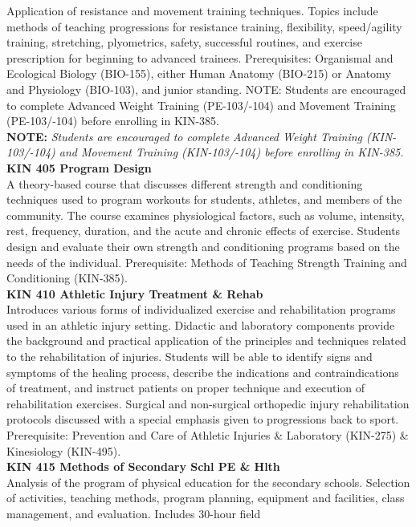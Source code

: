 \documentclass[
  letterpaper,
]{scrbook}
\begin{document}
Application of resistance and movement training techniques. Topics
include methods of teaching progressions for resistance training,
flexibility, speed/agility training, stretching, plyometrics, safety,
successful routines, and exercise prescription for beginning to advanced
trainees. Prerequisites: Organismal and Ecological Biology (BIO-155),
either Human Anatomy (BIO-215) or Anatomy and Physiology (BIO-103), and
junior standing. NOTE: Students are encouraged to complete Advanced
Weight Training (PE-103/-104) and Movement Training (PE-103/-104) before
enrolling in KIN-385.\\
\textbf{NOTE:} \emph{Students are encouraged to complete Advanced Weight
Training (KIN-103/-104) and Movement Training (KIN-103/-104) before
enrolling in KIN-385.}\\
\textbf{KIN 405 Program Design}\\
A theory-based course that discusses different strength and conditioning
techniques used to program workouts for students, athletes, and members
of the community. The course examines physiological factors, such as
volume, intensity, rest, frequency, duration, and the acute and chronic
effects of exercise. Students design and evaluate their own strength and
conditioning programs based on the needs of the individual.
Prerequisite: Methods of Teaching Strength Training and Conditioning
(KIN-385).\\
\textbf{KIN 410 Athletic Injury Treatment \& Rehab}\\
Introduces various forms of individualized exercise and rehabilitation
programs used in an athletic injury setting. Didactic and laboratory
components provide the background and practical application of the
principles and techniques related to the rehabilitation of injuries.
Students will be able to identify signs and symptoms of the healing
process, describe the indications and contraindications of treatment,
and instruct patients on proper technique and execution of
rehabilitation exercises. Surgical and non-surgical orthopedic injury
rehabilitation protocols discussed with a special emphasis given to
progressions back to sport. Prerequisite: Prevention and Care of
Athletic Injuries \& Laboratory (KIN-275) \& Kinesiology (KIN-495).\\
\textbf{KIN 415 Methods of Secondary Schl PE \& Hlth}\\
Analysis of the program of physical education for the secondary schools.
Selection of activities, teaching methods, program planning, equipment
and facilities, class management, and evaluation. Includes 30-hour field
\end{document}
